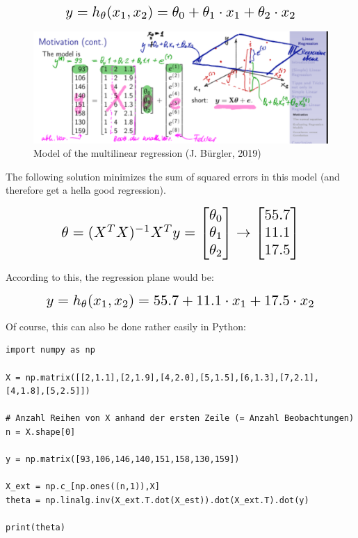 \documentclass[a4paper, 11pt]{article}
\begin{document}
\vspace{10px}

\[ \scalebox{1.5}{
    $y = h_\theta (x_1, x_2) = \theta_0 + \theta_1 \cdot x_1 + \theta_2 \cdot x_2$
}\]
    
\begin{figure}[htb!]
    \centering
    \includegraphics[keepaspectratio=true, width=\linewidth]{multilinear_regression.png}
    \caption{Model of the multilinear regression (\textcopyright J. Bürgler, 2019)}
    \label{multilinear_regression}
\end{figure}

The following solution  minimizes the sum of squared errors in this model (and therefore get a hella good regression).

\[ \scalebox{1.5}{
        $\theta = (X^T X)^{-1} X^T y = 
        \begin{bmatrix}
            \theta_0 \\
            \theta_1 \\
            \theta_2
        \end{bmatrix}  
        \rightarrow
        \begin{bmatrix}
            55.7 \\
            11.1 \\
            17.5 
        \end{bmatrix}  $
}\]

According to this, the regression plane would be:


\[ \scalebox{1.5}{
        $y = h_\theta (x_1, x_2) = 55.7 + 11.1 \cdot x_1 + 17.5 \cdot x_2$
}\]

\newpage

Of course, this can also be done rather easily in Python:

\begin{lstlisting}
import numpy as np

X = np.matrix([[2,1.1],[2,1.9],[4,2.0],[5,1.5],[6,1.3],[7,2.1],[4,1.8],[5,2.5]])

# Anzahl Reihen von X anhand der ersten Zeile (= Anzahl Beobachtungen)
n = X.shape[0]

y = np.matrix([93,106,146,140,151,158,130,159])

X_ext = np.c_[np.ones((n,1)),X]
theta = np.linalg.inv(X_ext.T.dot(X_est)).dot(X_ext.T).dot(y)

print(theta)
\end{lstlisting}
\end{document}
